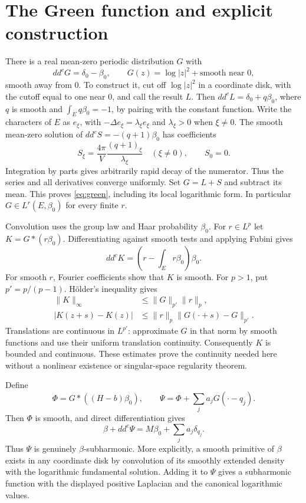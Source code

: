 \documentclass[11pt]{article}
\newcommand{\ddc}{dd^c}
\begin{document}
\section{The Green function and explicit construction}
There is a real mean-zero periodic distribution $G$ with
\begin{equation}\label{eq:green}
 \ddc G=\delta_0-\beta_0,
 \qquad G(z)=\log|z|^2+\text{smooth near }0,
\end{equation}
smooth away from $0$. To construct it, cut off $\log|z|^2$ in
a coordinate disk, with the cutoff equal to one near $0$, and call the
result $L$. Then $\ddc L=\delta_0+q\beta_0$, where $q$ is smooth
and $\int_Eq\beta_0=-1$, by pairing with the constant function.
Write the characters of $E$ as $e_\xi$, with
$-\Delta e_\xi=\lambda_\xi e_\xi$ and $\lambda_\xi>0$ when
$\xi\ne0$. The smooth mean-zero solution of
$\ddc S=-(q+1)\beta_0$ has coefficients
\[
 S_\xi=\frac{4\pi}{V}\frac{(q+1)_\xi}{\lambda_\xi}
 \quad(\xi\ne0),\qquad S_0=0.
\]
Integration by parts gives arbitrarily rapid decay of the numerator.
Thus the series and all derivatives converge uniformly. Set $G=L+S$
and subtract its mean. This proves \eqref{eq:green}, including its
local logarithmic form. In particular $G\in L^r(E,\beta_0)$ for
every finite $r$.

Convolution uses the group law and Haar probability $\beta_0$.
For $r\in L^p$ let $K=G*(r\beta_0)$. Differentiating against
smooth tests and applying Fubini gives
\begin{equation}\label{eq:convolution}
 \ddc K=\left(r-\int_Er\beta_0\right)\beta_0.
\end{equation}
For smooth $r$, Fourier coefficients show that $K$ is smooth. For
$p>1$, put $p'=p/(p-1)$. H\"older's inequality gives
\begin{align*}
 \|K\|_\infty&\leq\|G\|_{p'}\|r\|_p,\\
 |K(z+s)-K(z)|&\leq\|r\|_p
                      \|G(\cdot+s)-G\|_{p'}.
\end{align*}
Translations are continuous in $L^{p'}$: approximate $G$ in that norm
by smooth functions and use their uniform translation continuity.
Consequently $K$ is bounded and continuous. These estimates prove the
continuity needed here without a nonlinear existence or singular-space
regularity theorem.

Define
\[
 \Phi=G*((H-b)\beta_0),\qquad
 \Psi=\Phi+\sum_ja_jG(\cdot-q_j).
\]
Then $\Phi$ is smooth, and direct differentiation gives
\begin{equation}\label{eq:reference}
 \beta+\ddc\Psi=M\beta_0+\sum_ja_j\delta_{q_j}.
\end{equation}
Thus $\Psi$ is genuinely $\beta$-subharmonic. More explicitly, a
smooth primitive of $\beta$ exists in any coordinate disk by convolution
of its smoothly extended density with the logarithmic fundamental
solution. Adding it to $\Psi$ gives a subharmonic function with the
displayed positive Laplacian and the canonical logarithmic values.
\end{document}
